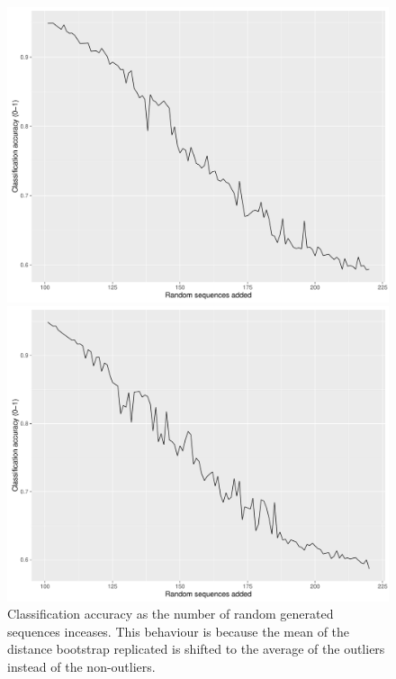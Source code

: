 \documentclass[a4paper]{llncs}
\begin{document}
\begin{figure}
    \raggedleft
    \begin{minipage}{0.6\textwidth}
        \centering
        \includegraphics[scale = 0.25]{pics/odseq_accuracy_random_linear}
    \end{minipage}%
    \begin{minipage}{0.5\textwidth}
        \raggedright
        \includegraphics[scale = 0.25]{pics/odseq_accuracy_random_affine}
    \end{minipage}
    \caption{Classification accuracy as the number of random generated sequences inceases. This behaviour is because the mean of the distance bootstrap replicated is shifted to the average of the outliers instead of the non-outliers.} 
\label{fig:odseq_accuracy_random}
\end{figure}
\end{document}
